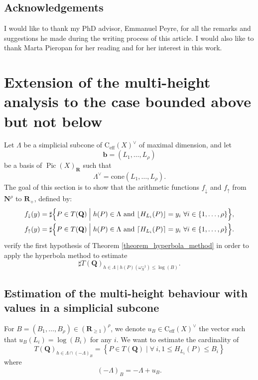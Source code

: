 \documentclass{proc-l}
\newcommand{\R}{\mathbf{R}}
\newcommand{\N}{\mathbf{N}}
\newcommand{\Q}{\mathbf{Q}}
\newcommand{\base}{\mathbf{b}}
\newcommand{\cone}{\text{C}_{\text{eff}}(X)}
\DeclareMathOperator{\Pic}{Pic}
\newcommand{\w}{\omega}
\theoremstyle{definition}
\theoremstyle{remark}
\numberwithin{equation}{section}
\begin{document}
\subsection{Acknowledgements}
I would like to thank my PhD advisor, Emmanuel Peyre, for all the remarks and suggestions he made during the writing process of this article. I would also like to thank Marta Pieropan for her reading and for her interest in this work.



\section{Extension of the multi-height analysis to the case bounded above but not below}




Let $\Lambda$ be a simplicial subcone of $\cone^{\vee}$ of maximal dimension, and let $$\base = (L_1, \dots, L_\rho)$$be a basis of $\Pic(X)_{\R}$ such that $$\Lambda^{\vee} = \mathrm{cone}(L_1, \dots, L_{\rho}).$$The goal of this section is to show that the arithmetic functions $f_{\downarrow}$ and $f_{\uparrow}$ from $ \N^{\rho}$ to $ \R_+ $, defined by:
\begin{equation}\label{equation_definition_arithmetic_functions}
\begin{aligned}
f_{\downarrow}(y)
&=
\sharp \Bigl\{
P \in T(\Q)
\;\Big|\;
h(P) \in \Lambda
\ \text{and}\
\lfloor H_{L_i}(P) \rfloor = y_i
\ \forall i \in \{1,\ldots,\rho\}
\Bigr\}, \\
f_{\uparrow}(y)
&=
\sharp \Bigl\{
P \in T(\Q)
\;\Big|\;
h(P) \in \Lambda
\ \text{and}\
\lceil H_{L_i}(P) \rceil = y_i
\ \forall i \in \{1,\ldots,\rho\}
\Bigr\}.
\end{aligned}
\end{equation}
verify the first hypothesis of Theorem \ref{theorem_hyperbola_method} in order to apply the hyperbola method to estimate $$\sharp T(\Q)_{h \in \Lambda \mid h(P)(\w_{X}^{-1}) \leqslant \log(B)} .$$


\subsection{Estimation of the  multi-height behaviour with values in a simplicial subcone}

For $B = (B_1, \dots, B_{\rho}) \in (\R_{\geqslant 1})^{\rho}$, we denote $u_B \in \cone^{\vee}$ the vector such that $u_B(L_i) = \log(B_i)$ for any $i$. We want to estimate the cardinality of $$T(\Q)_{h \in \Lambda \cap (-\Lambda)_B }= \left\{ P \in T(\Q) \mid \forall \ i,  1 \leqslant H_{L_i}(P) \leqslant B_i \right\} $$ where $$ (-\Lambda)_B = -\Lambda + u_B .$$ 
\end{document}
